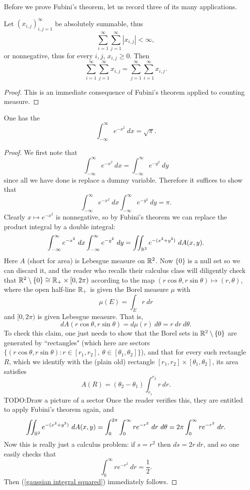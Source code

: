 Before we prove Fubini's theorem, let us record three of its many applications.
\begin{corollary}
Let $(x_{i,j})_{i,j=1}^\infty$ be absolutely summable, thus
\[\sum_{i=1}^{\infty} \sum_{j=1}^{\infty} |x_{i,j}| < \infty,\]
or nonnegative, thus for every $i,j$, $x_{i,j} \geq 0$. Then
\[\sum_{i=1}^{\infty} \sum_{j=1}^{\infty} x_{i,j} = \sum_{j=1}^{\infty} \sum_{i=1}^{\infty} x_{i,j}.\]
\end{corollary}
\begin{proof}
This is an immediate consequence of Fubini's theorem applied to counting measure.
\end{proof}

\begin{corollary}
One has the 
\[\int_{-\infty}^{\infty} e^{-x^2} ~dx = \sqrt \pi.\]
\end{corollary}
\begin{proof}
We first note that
\[\int_{-\infty}^{\infty} e^{-x^2}~dx = \int_{-\infty}^{\infty} e^{-y^2}~dy\]
since all we have done is replace a dummy variable. Therefore it suffices to show that
\begin{equation}
\label{gaussian integral squared}
\int_{-\infty}^{\infty} e^{-x^2}~dx \int_{-\infty}^{\infty} e^{-y^2}~dy = \pi.
\end{equation}
Clearly $x \mapsto e^{-x^2}$ is nonnegative, so by Fubini's theorem we can replace the product integral by a double integral:
\[\int_{-\infty}^{\infty} e^{-x^2}~dx \int_{-\infty}^{\infty} e^{-y^2}~dy = \iint_{\mathbb{R}^2} e^{-(x^2 + y^2)}~dA(x, y).\]
Here $A$ (short for area) is Lebesgue measure on $\mathbb{R}^2$.
Now $\{0\}$ is a null set so we can discard it, and the reader who recalls their calculus class will diligently check that $\mathbb{R}^2 \setminus \{0\} \cong \mathbb{R}_+ \times [0, 2\pi)$ according to the map $(r \cos \theta, r \sin \theta) \mapsto (r, \theta)$, where the open half-line $\mathbb{R}_+$ is given the Borel measure $\mu$ with
\[\mu(E) = \int_{E} r~dr\]
and $[0, 2\pi)$ is given Lebesgue measure. That is,
\[dA(r \cos \theta, r \sin \theta) = d\mu(r) ~d\theta = r~dr~d\theta.\]
To check this claim, one just needs to show that the Borel sets in $\mathbb{R}^2 \setminus \{0\}$ are generated by ``rectangles" (which here are sectors $\{(r \cos \theta, r \sin \theta): r \in [r_1, r_2], ~\theta \in [\theta_1, \theta_2]\}$), and that for every such rectangle $R$, which we identify with the (plain old) rectangle $[r_1, r_2] \times [\theta_1, \theta_2]$, its area satisfies
\[A(R) = (\theta_2 - \theta_1)\int_{r_1}^{r_2} r~dr.\]
TODO:Draw a picture of a sector
Once the reader verifies this, they are entitled to apply Fubini's theorem again, and
\[\iint_{\mathbb{R}^2} e^{-(x^2 + y^2)}~dA(x, y) = \int_0^{2\pi} \int_0^{\infty} re^{-r^2}~dr~d\theta = 2\pi \int_0^{\infty} re^{-r^2}~dr.\]
Now this is really just a calculus problem: if $s = r^2$ then $ds = 2r~dr$, and so one easily checks that
\[\int_0^{\infty} re^{-r^2}~dr = \frac{1}{2}.\]
Then (\ref{gaussian integral squared}) immediately follows.
\end{proof}

